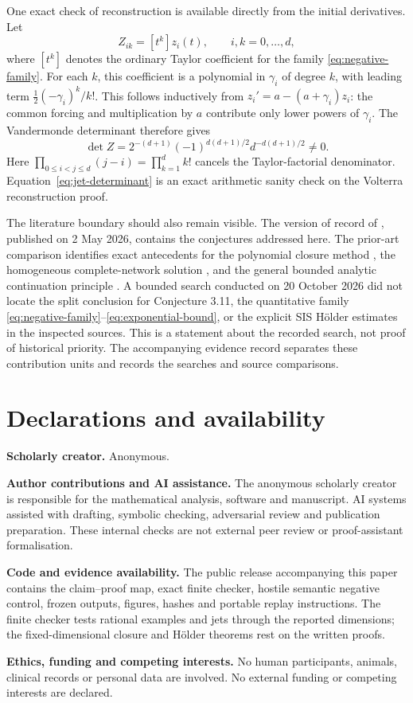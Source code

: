 One exact check of reconstruction is available directly from the initial derivatives. Let
\[
 Z_{ik}=[t^k]z_i(t),\qquad i,k=0,\ldots,d,
\]
where $[t^k]$ denotes the ordinary Taylor coefficient for the family \eqref{eq:negative-family}. For each $k$, this coefficient is a polynomial in $\gamma_i$ of degree $k$, with leading term $\tfrac12(-\gamma_i)^k/k!$. This follows inductively from $z_i'=a-(a+\gamma_i)z_i$: the common forcing and multiplication by $a$ contribute only lower powers of $\gamma_i$. The Vandermonde determinant therefore gives
\begin{equation}
 \det Z=
 2^{-(d+1)}(-1)^{d(d+1)/2}
 d^{-d(d+1)/2}\ne0.
 \label{eq:jet-determinant}
\end{equation}
Here $\prod_{0\leq i<j\leq d}(j-i)=\prod_{k=1}^d k!$ cancels the Taylor-factorial denominator. Equation~\eqref{eq:jet-determinant} is an exact arithmetic sanity check on the Volterra reconstruction proof.

The literature boundary should also remain visible. The version of record of \cite{KH2026}, published on 2 May 2026, contains the conjectures addressed here. The prior-art comparison identifies exact antecedents for the polynomial closure method \cite{NY1999}, the homogeneous complete-network solution \cite{PDM2021}, and the general bounded analytic continuation principle \cite{T2020}. A bounded search conducted on 20 October 2026 did not locate the split conclusion for Conjecture 3.11, the quantitative family \eqref{eq:negative-family}--\eqref{eq:exponential-bound}, or the explicit SIS Hölder estimates in the inspected sources. This is a statement about the recorded search, not proof of historical priority. The accompanying evidence record separates these contribution units and records the searches and source comparisons.

\section*{Declarations and availability}

\textbf{Scholarly creator.} Anonymous.

\textbf{Author contributions and AI assistance.} The anonymous scholarly
creator is responsible for the mathematical analysis, software and manuscript.
AI systems assisted with drafting, symbolic checking, adversarial review and
publication preparation. These internal checks are not external peer review
or proof-assistant formalisation.

\textbf{Code and evidence availability.} The public release accompanying this
paper contains the claim--proof map, exact finite checker, hostile semantic
negative control, frozen outputs, figures, hashes and portable replay
instructions. The finite checker tests rational examples and jets through the
reported dimensions; the fixed-dimensional closure and H\"older theorems rest
on the written proofs.

\textbf{Ethics, funding and competing interests.} No human participants,
animals, clinical records or personal data are involved. No external funding
or competing interests are declared.
